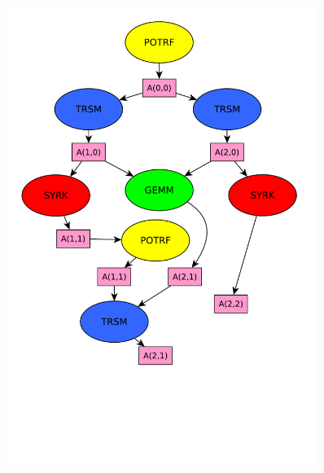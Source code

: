 \documentclass[xcolor={usenames,dvipsnames,svgnames,table}, aspectratio=43]{beamer}
\begin{document}
\begin{frame}[fragile]
\begin{minipage}[t]{0.46\linewidth}
\begin{figure}
{    \includegraphics[width=0.9\textwidth]{graph/anim-dag/anim-6.pdf}%
  }%
\end{figure}
\end{minipage}
\end{frame}
\end{document}
